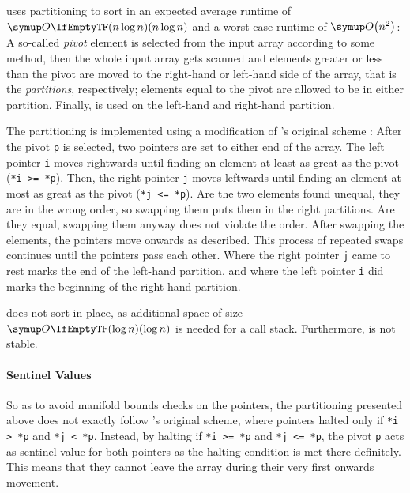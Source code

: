 \section{\texorpdfstring{\QS{}}{QuickSort}}
\label{sec:tasklet:quick}

\QS{} \cites{hoare1962quicksort}[88-91]{maurer1974datenstrukturen}[Chapter~2.2.6]{wirth1975algorithmen} uses partitioning to sort in an expected average runtime of \(\bigoh{n \log n}\) and a worst-case runtime of \(\bigoh*{n^2}\):
A so-called \emph{pivot} element is selected from the input array according to some method, then the whole input array gets scanned and elements greater or less than the pivot are moved to the right-hand or left-hand side of the array, that is the \emph{partitions}, respectively;
elements equal to the pivot are allowed to be in either partition.
Finally, \QS{} is used on the left-hand and right-hand partition.

The partitioning is implemented using a modification of \citeauthor{hoare1962quicksort}'s original scheme \cite{hoare1962quicksort}:
After the pivot \lstinline|p| is selected, two pointers are set to either end of the array.
The left pointer \lstinline|i| moves rightwards until finding an element at least as great as the pivot (\lstinline|*i >= *p|).
Then, the right pointer \lstinline|j| moves leftwards until finding an element at most as great as the pivot (\lstinline|*j <= *p|).
Are the two elements found unequal, they are in the wrong order, so swapping them puts them in the right partitions.
Are they equal, swapping them anyway does not violate the order.
After swapping the elements, the pointers move onwards as described.
This process of repeated swaps continues until the pointers pass each other.
Where the right pointer \lstinline|j| came to rest marks the end of the left-hand partition, and where the left pointer \lstinline|i| did marks the beginning of the right-hand partition.

\QS{} does not sort in-place, as additional space of size \(\bigoh{\log n}\) is needed for a call stack.
Furthermore, \QS{} is not stable.


\paragraph{Sentinel Values}
\label{sec:tasklet:quick:imp:sentinels}
So as to avoid manifold bounds checks on the pointers, the partitioning presented above does not exactly follow \citeauthor{hoare1962quicksort}'s original scheme, where pointers halted only if \lstinline|*i > *p| and \lstinline|*j < *p|.
Instead, by halting if \lstinline|*i >= *p| and \lstinline|*j <= *p|, the pivot \lstinline|p| acts as sentinel value for both pointers as the halting condition is met there definitely.
This means that they cannot leave the array during their very first onwards movement.

